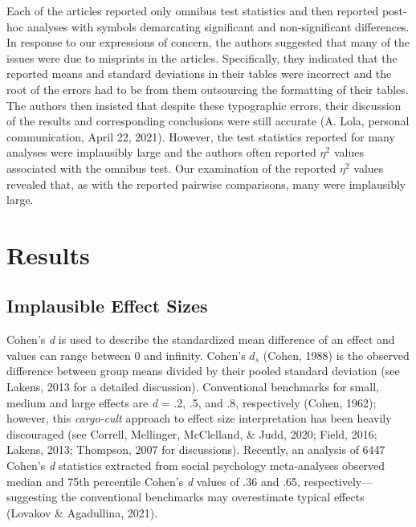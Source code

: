 \documentclass[
  english,
  man, donotrepeattitle,floatsintext]{apa7}
\begin{document}
Each of the articles reported only omnibus test statistics and then reported post-hoc analyses with symbols demarcating significant and non-significant differences. In response to our expressions of concern, the authors suggested that many of the issues were due to misprints in the articles. Specifically, they indicated that the reported means and standard deviations in their tables were incorrect and the root of the errors had to be from them outsourcing the formatting of their tables. The authors then insisted that despite these typographic errors, their discussion of the results and corresponding conclusions were still accurate (A. Lola, personal communication, April 22, 2021). However, the test statistics reported for many analyses were implausibly large and the authors often reported \(\eta^{2}\) values associated with the omnibus test. Our examination of the reported \(\eta^{2}\) values revealed that, as with the reported pairwise comparisons, many were implausibly large.

\hypertarget{results}{%
\section{Results}\label{results}}

\hypertarget{implausible-effect-sizes}{%
\subsection{Implausible Effect Sizes}\label{implausible-effect-sizes}}

Cohen's \emph{d} is used to describe the standardized mean difference of an effect and values can range between 0 and infinity. Cohen's \(d_{s}\) (Cohen, 1988) is the observed difference between group means divided by their pooled standard deviation (see Lakens, 2013 for a detailed discussion). Conventional benchmarks for small, medium and large effects are \emph{d} = .2, .5, and .8, respectively (Cohen, 1962); however, this \emph{cargo-cult} approach to effect size interpretation has been heavily discouraged (see Correll, Mellinger, McClelland, \& Judd, 2020; Field, 2016; Lakens, 2013; Thompson, 2007 for discussions). Recently, an analysis of 6447 Cohen's \emph{d} statistics extracted from social psychology meta-analyses observed median and 75th percentile Cohen's \emph{d} values of .36 and .65, respectively---suggesting the conventional benchmarks may overestimate typical effects (Lovakov \& Agadullina, 2021).
\end{document}
